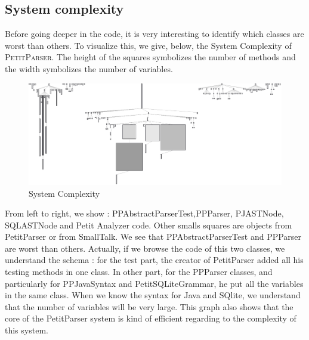 \subsection{System complexity}
Before going deeper in the code, it is very interesting to identify which classes are worst than others.  To visualize this, we give, below, the System Complexity of \textsc{PetitParser}.
The height of the squares symbolizes the number of methods and the width symbolizes the number of variables.
\begin{figure}[ht!]
\label{system_complexity}
\includegraphics[scale=0.35]{system_complexity.png}
\caption{System Complexity}
\end{figure}
From left to right, we show : PPAbstractParserTest,PPParser, PJASTNode, SQLASTNode and Petit Analyzer code.  Other smalls squares are objects from PetitParser or from SmallTalk.
We see that PPAbstractParserTest and PPParser are worst than others.  Actually, if we browse the code of this two classes, we understand the schema : for the test part, the creator of PetitParser added all his testing methods in one class.  In other part, for the PPParser classes, and particularly for PPJavaSyntax and PetitSQLiteGrammar, he put all the variables in the same class.  When we know the syntax for Java and SQlite, we understand that the number of variables will be very large.
This graph also shows that the core of the PetitParser system is kind of efficient regarding to the complexity of this system.
